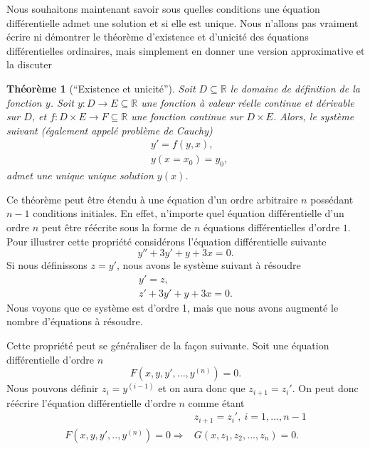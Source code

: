 \documentclass[a4paper,12pt]{book}
\newcommand{\real}{\mathbb{R}}
\newtheorem{theoreme}{Théorème}
\begin{document}
Nous souhaitons maintenant savoir sous quelles conditions une équation différentielle admet une solution 
et si elle est unique. Nous n'allons pas vraiment écrire ni démontrer le théorème 
d'existence et d'unicité des équations différentielles ordinaires, mais simplement en donner une 
version approximative et la discuter
\begin{theoreme}[``Existence et unicité'']
 Soit $D\subseteq\real$ le domaine de définition de la fonction $y$. Soit  
 $y:D\rightarrow E\subseteq \real$ une fonction à valeur réelle continue et dérivable sur $D$, 
 et $f:D\times E\rightarrow F\subseteq\real$ une fonction continue sur $D\times E$. 
 Alors, le système suivant (également appelé problème de Cauchy)
 \begin{align}
  &y'=f(y,x),\\
  &y(x=x_0)=y_0,
 \end{align}
admet une unique unique solution $y(x)$.
\end{theoreme}
Ce théorème peut être étendu à une équation d'un ordre arbitraire $n$ possédant $n-1$
conditions initiales. En effet, n'importe quel équation différentielle d'un ordre $n$
peut être réécrite sous la forme de $n$ équations différentielles d'ordre $1$.
Pour illustrer cette propriété considérons l'équation différentielle suivante
\begin{equation}
 y''+3y'+y+3x=0.
\end{equation}
Si nous définissons $z=y'$, nous avons le système suivant à résoudre
\begin{align}
 y'=z,\\
 z'+3y'+y+3x=0.
\end{align}
Nous voyons que ce système est d'ordre 1, mais que nous avons augmenté le nombre d'équations à résoudre.

Cette propriété peut se généraliser de la façon suivante. 
Soit une équation différentielle d'ordre $n$
\begin{equation}
 F(x,y,y',...,y^{(n)})=0.
\end{equation}
Nous pouvons définir $z_i=y^{(i-1)}$ et on aura donc que $z_{i+1}=z_i'$. On peut donc 
réécrire l'équation différentielle d'ordre $n$ comme étant 
\begin{align}
 &z_{i+1}=z_i',\ i=1,...,n-1\\
 F(x,y,y',..,y^{(n)})=0 \Rightarrow &G(x,z_1,z_2,...,z_n)=0.
\end{align}
\end{document}
